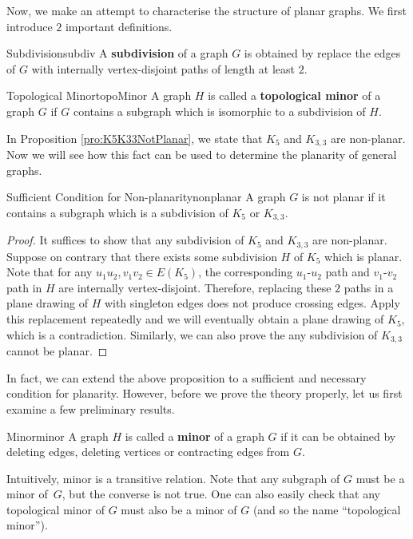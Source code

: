 \documentclass[math]{amznotes}
\theoremstyle{remark}
\newcommand{\0}{\mathbf{0}}
\newcommand{\1}{\mathbf{1}}
\begin{document}
Now, we make an attempt to characterise the structure of planar graphs. We first introduce $2$ important definitions.
\begin{dfnbox}{Subdivision}{subdiv}
    A {\color{red} \textbf{subdivision}} of a graph $G$ is obtained by replace the edges of $G$ with internally vertex-disjoint paths of length at least $2$.
\end{dfnbox}
\begin{dfnbox}{Topological Minor}{topoMinor}
    A graph $H$ is called a {\color{red} \textbf{topological minor}} of a graph $G$ if $G$ contains a subgraph which is isomorphic to a subdivision of $H$.
\end{dfnbox}
In Proposition \ref{pro:K5K33NotPlanar}, we state that $K_5$ and $K_{3, 3}$ are non-planar. Now we will see how this fact can be used to determine the planarity of general graphs.
\begin{probox}{Sufficient Condition for Non-planarity}{nonplanar}
    A graph $G$ is not planar if it contains a subgraph which is a subdivision of $K_5$ or $K_{3, 3}$.
    \tcblower
    \begin{proof}
        It suffices to show that any subdivision of $K_5$ and $K_{3, 3}$ are non-planar. Suppose on contrary that there exists some subdivision $H$ of $K_5$ which is planar. Note that for any $u_1u_2, v_1v_2 \in E(K_5)$, the corresponding $u_1$-$u_2$ path and $v_1$-$v_2$ path in $H$ are internally vertex-disjoint. Therefore, replacing these $2$ paths in a plane drawing of $H$ with singleton edges does not produce crossing edges. Apply this replacement repeatedly and we will eventually obtain a plane drawing of $K_5$, which is a contradiction. Similarly, we can also prove the any subdivision of $K_{3, 3}$ cannot be planar.
    \end{proof}
\end{probox}
In fact, we can extend the above proposition to a sufficient and necessary condition for planarity. However, before we prove the theory properly, let us first examine a few preliminary results.
\begin{dfnbox}{Minor}{minor}
    A graph $H$ is called a {\color{red} \textbf{minor}} of a graph $G$ if it can be obtained by deleting edges, deleting vertices or contracting edges from $G$.
\end{dfnbox}
Intuitively, minor is a transitive relation. Note that any subgraph of $G$ must be a minor of~$G$, but the converse is not true. One can also easily check that any topological minor of $G$ must also be a minor of $G$ (and so the name ``topological minor''). 
\end{document}

